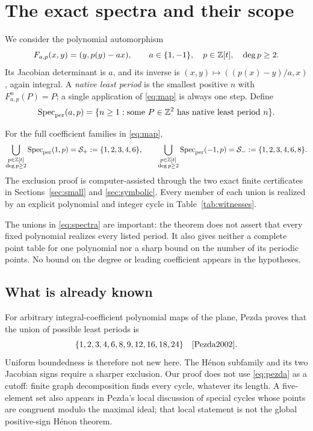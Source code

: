 \section{The exact spectra and their scope}\label{sec:theorem}

We consider the polynomial automorphism
\begin{equation}\label{eq:map}
 F_{a,p}(x,y)=(y,p(y)-ax),\qquad
 a\in\{1,-1\},\quad p\in\mathbb Z[t],\quad\deg p\ge2.
\end{equation}
Its Jacobian determinant is $a$, and its inverse is
$(x,y)\mapsto((p(x)-y)/a,x)$, again integral. A \emph{native least
period} is the smallest positive $n$ with $F_{a,p}^n(P)=P$; a single
application of \eqref{eq:map} is always one step. Define
\[
 \operatorname{Spec}_{\mathrm{per}}(a,p)=\{n\ge1:\text{some }P\in\mathbb Z^2
                    \text{ has native least period }n\}.
\]

\begin{theorem}\label{thm:spectra}
For the full coefficient families in \eqref{eq:map},
\begin{equation}\label{eq:spectra}
 \bigcup_{\substack{p\in\mathbb Z[t]\\\deg p\ge2}}\operatorname{Spec}_{\mathrm{per}}(1,p)
 =\mathcal S_+:=\{1,2,3,4,6\},\qquad
 \bigcup_{\substack{p\in\mathbb Z[t]\\\deg p\ge2}}\operatorname{Spec}_{\mathrm{per}}(-1,p)
 =\mathcal S_-:=\{1,2,3,4,6,8\}.
\end{equation}
The exclusion proof is computer-assisted through the two exact finite
certificates in Sections~\ref{sec:small} and \ref{sec:symbolic}.
Every member of each union is realized by an explicit polynomial
and integer cycle in Table~\ref{tab:witnesses}.
\end{theorem}

The unions in \eqref{eq:spectra} are important: the theorem does not
assert that every fixed polynomial realizes every listed period.
It also gives neither a complete point table for one polynomial nor
a sharp bound on the number of its periodic points. No bound on
the degree or leading coefficient appears in the hypotheses.

\subsection{What is already known}
For arbitrary integral-coefficient polynomial maps of the plane,
Pezda proves that the union of possible least periods is
\begin{equation}\label{eq:pezda}
 \{1,2,3,4,6,8,9,12,16,18,24\}
 \quad\text{\cite[Theorem~2.1]{Pezda2002}}.
\end{equation}
Uniform boundedness is therefore not new here. The H\'enon subfamily
and its two Jacobian signs require a sharper exclusion. Our proof
does not use \eqref{eq:pezda} as a cutoff: finite graph decomposition
finds every cycle, whatever its length. A five-element set also
appears in Pezda's local discussion of special cycles whose points
are congruent modulo the maximal ideal; that local statement is
not the global positive-sign H\'enon theorem.

